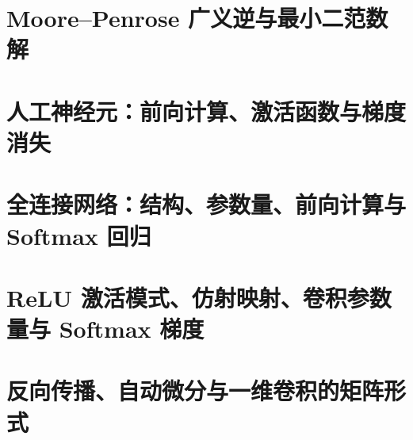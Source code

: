 \documentclass[11pt,a4paper]{ctexart}
\begin{document}
\newpage
\section{Moore--Penrose 广义逆与最小二范数解}


\newpage
\section{人工神经元：前向计算、激活函数与梯度消失}


\newpage
\section{全连接网络：结构、参数量、前向计算与 Softmax 回归}


\newpage
\section{ReLU 激活模式、仿射映射、卷积参数量与 Softmax 梯度}


\newpage
\section{反向传播、自动微分与一维卷积的矩阵形式}

\end{document}
